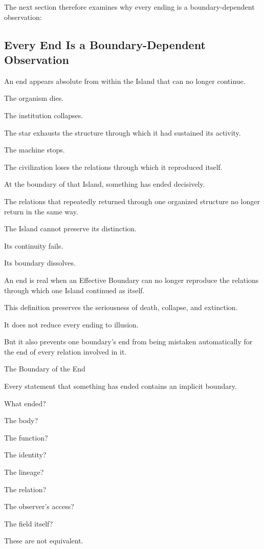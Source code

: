 The next section therefore examines why every ending is a boundary-dependent observation:

\subsection*{\textbf{Every End Is a Boundary-Dependent Observation}} 

An end appears absolute from within the Island that can no longer continue.

The organism dies.

The institution collapses.

The star exhausts the structure through which it had sustained its activity.

The machine stops.

The civilization loses the relations through which it reproduced itself.

At the boundary of that Island, something has ended decisively.

The relations that repeatedly returned through one organized structure no longer return in the same way.

The Island cannot preserve its distinction.

Its continuity fails.

Its boundary dissolves.

An end is real when an Effective Boundary can no longer reproduce the relations through which one Island continued as itself.

This definition preserves the seriousness of death, collapse, and extinction.

It does not reduce every ending to illusion.

But it also prevents one boundary’s end from being mistaken automatically for the end of every relation involved in it.

The Boundary of the End

Every statement that something has ended contains an implicit boundary.

What ended?

The body?

The function?

The identity?

The lineage?

The relation?

The observer’s access?

The field itself?

These are not equivalent.

